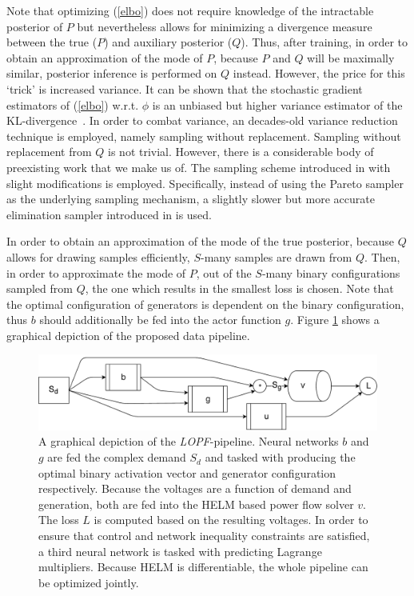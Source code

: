 Note that optimizing (\ref{elbo}) does not require knowledge of the intractable posterior of $P$ but nevertheless allows for minimizing a divergence measure between the true ($P$) and auxiliary posterior ($Q$). Thus, after training, in order to obtain an approximation of the mode of $P$, because $P$ and $Q$ will be maximally similar, posterior inference is performed on $Q$ instead.
However, the price for this `trick' is increased variance. It can be shown that the stochastic gradient estimators of (\ref{elbo}) w.r.t. $\phi$ is an unbiased but higher variance estimator of the KL-divergence~\cite{mnih2014neural}. In order to combat variance, an decades-old variance reduction technique is employed, namely sampling without replacement. Sampling without replacement from $Q$ is not trivial. However, there is a considerable body of preexisting work that we make us of. The sampling scheme introduced in \cite{shah2018without} with slight modifications is employed. Specifically, instead of using the Pareto sampler as the underlying sampling mechanism, a slightly slower but more accurate elimination sampler introduced in \cite{deville1998unequal} is used.

In order to obtain an approximation of the mode of the true posterior, because $Q$ allows for drawing samples efficiently, $S$-many samples are drawn from $Q$. Then, in order to approximate the mode of $P$, out of the $S$-many binary configurations sampled from $Q$, the one which results in the smallest loss is chosen. Note that the optimal configuration of generators is dependent on the binary configuration, thus $b$ should additionally be fed into the actor function $g$. Figure \ref{fig:pipe} shows a graphical depiction of the proposed data pipeline.
\begin{figure}
\includegraphics[width=0.95\linewidth]{krtofl/pipeline.pdf}
\caption[LOPF: Graphical depiction of the algorithmic pipeline]{A graphical depiction of the \emph{LOPF}-pipeline. Neural networks $b$ and $g$ are fed the complex demand $S_d$ and tasked with producing the optimal binary activation vector and generator configuration respectively. Because the voltages are a function of demand and generation, both are fed into the HELM based power flow solver $v$. The loss $L$ is computed based on the resulting voltages. In order to ensure that control and network inequality constraints are satisfied, a third neural network is tasked with predicting Lagrange multipliers. Because HELM is differentiable, the whole pipeline can be optimized jointly.}
\label{fig:pipe}
\end{figure}

